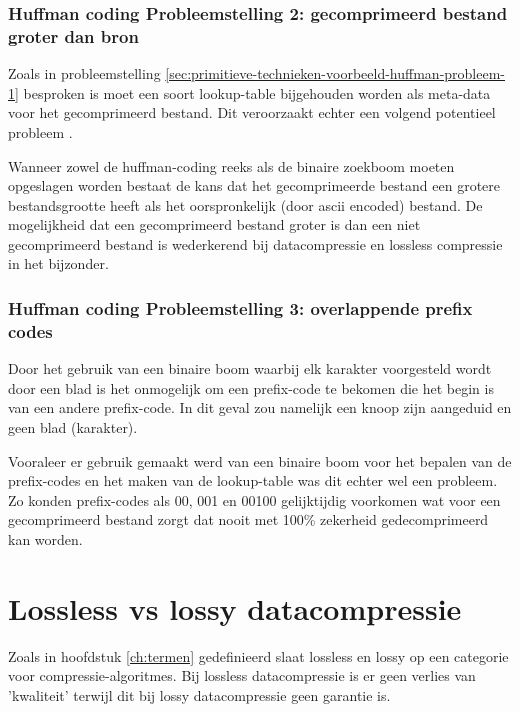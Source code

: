 \subsubsection{Huffman coding Probleemstelling 2: gecomprimeerd bestand groter dan bron}
Zoals in probleemstelling \ref{sec:primitieve-technieken-voorbeeld-huffman-probleem-1} besproken is moet een soort \gls{lookup-table} bijgehouden worden als \gls{meta-data} voor het gecomprimeerd bestand. Dit veroorzaakt echter een volgend potentieel probleem .


Wanneer zowel de \gls{huffman-coding} reeks als de binaire zoekboom moeten opgeslagen worden bestaat de kans dat het gecomprimeerde bestand een grotere bestandsgrootte heeft als het oorspronkelijk (door \gls{ascii} encoded) bestand. De mogelijkheid dat een gecomprimeerd bestand groter is dan een niet gecomprimeerd bestand is wederkerend bij \gls{datacompressie} en \gls{lossless} compressie in het bijzonder.


\subsubsection{Huffman coding Probleemstelling 3: overlappende prefix codes}
\label{sec:primitieve-technieken-voorbeeld-huffman-probleem-3}
\label{sec:primitieve-technieken-voorbeeld-huffman-probleem-2}
Door het gebruik van een binaire boom waarbij elk karakter voorgesteld wordt door een blad is het onmogelijk om een \gls{prefix-code} te bekomen die het begin is van een andere \gls{prefix-code}. In dit geval zou namelijk een knoop zijn aangeduid en geen blad (karakter).

Vooraleer er gebruik gemaakt werd van een binaire boom voor het bepalen van de \glspl{prefix-code} en het maken van de \gls{lookup-table} was dit echter wel een probleem. Zo konden \glspl{prefix-code} als 00, 001 en 00100 gelijktijdig voorkomen wat voor een gecomprimeerd bestand zorgt dat nooit met 100\% zekerheid gedecomprimeerd kan worden.

\section{Lossless vs lossy datacompressie}
\label{sec:ontstaan-datacompressie-lossless-lossy}
Zoals in hoofdstuk \ref{ch:termen} gedefinieerd slaat \gls{lossless} en \gls{lossy} op een categorie voor \glspl{compressie-algoritme}.
Bij \gls{lossless} \gls{datacompressie} is er geen verlies van 'kwaliteit' terwijl dit bij \gls{lossy} \gls{datacompressie} geen garantie is.

